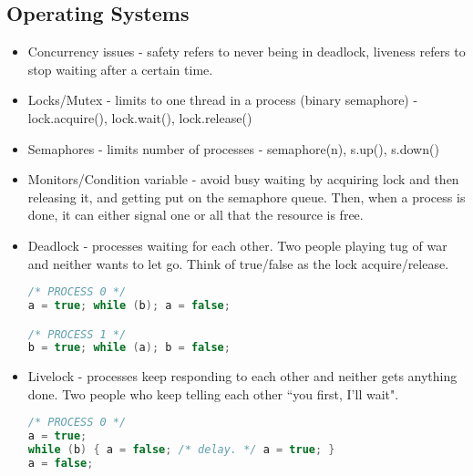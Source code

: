 \subsection{Operating Systems}
\begin{itemize}
    \itemsep0em
    \item Concurrency issues - safety refers to never being in deadlock, liveness refers to stop waiting after a certain time.
    \item Locks/Mutex - limits to one thread in a process (binary semaphore) - lock.acquire(), lock.wait(), lock.release()
    \item Semaphores - limits number of processes - semaphore(n), s.up(), s.down()
    \item Monitors/Condition variable - avoid busy waiting by acquiring lock and then releasing it, and getting put on the semaphore queue. Then, when a process is done, it can either signal one or all that the resource is free.
    \item Deadlock - processes waiting for each other. Two people playing tug of war and neither wants to let go. Think of true/false as the lock acquire/release.
    \begin{lstlisting}[language=c]
/* PROCESS 0 */
a = true; while (b); a = false; 

/* PROCESS 1 */
b = true; while (a); b = false;
    \end{lstlisting}
    \item Livelock - processes keep responding to each other and neither gets anything done. Two people who keep telling each other ``you first, I'll wait".
\begin{lstlisting}[language=c]
/* PROCESS 0 */
a = true; 
while (b) { a = false; /* delay. */ a = true; }
a = false; 


\end{lstlisting}
\end{itemize}
